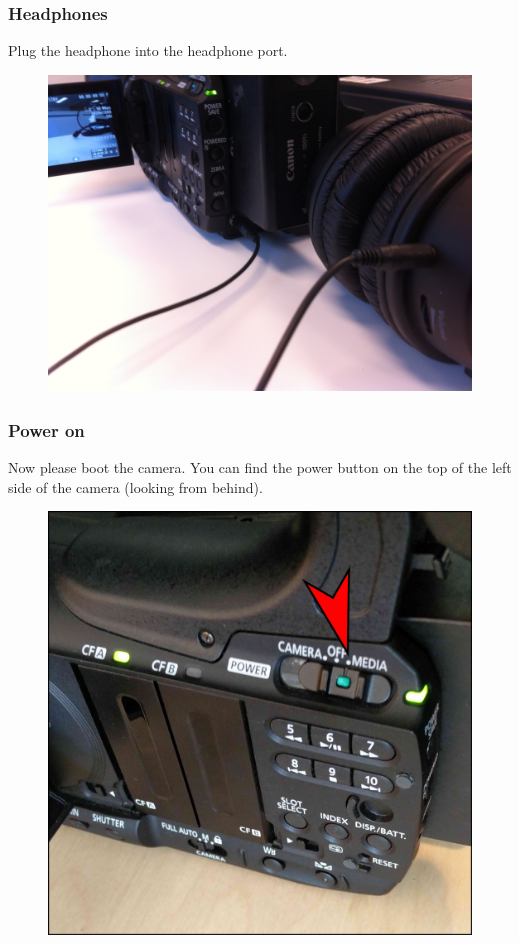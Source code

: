 \documentclass{article}
\begin{document}
\subsubsection{Headphones}
Plug the headphone into the headphone port.

\begin{figure}[H]
  \centering
\includegraphics[width = 120mm]{canon_headphones.jpg}
\end{figure}


\subsubsection{Power on}
Now please boot the camera. You can find the power button on the top of the left side of the camera (looking from behind).

\begin{figure}[H]
  \centering
\includegraphics[width = 120mm]{Canon03.jpg}
\end{figure}
\end{document}
